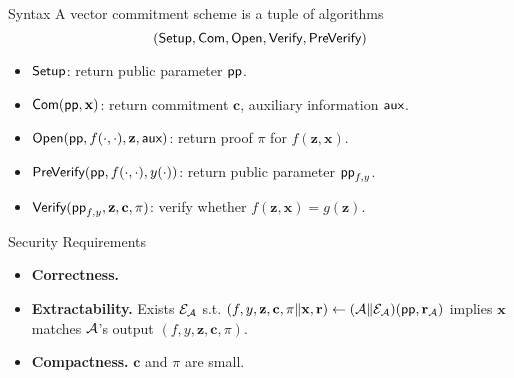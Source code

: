 \begin{frame}{Syntax}
	A vector commitment scheme is a tuple of algorithms
	\begin{equation*}
		(\textsf{Setup}, \textsf{Com}, \textsf{Open}, \textsf{Verify}, \textsf{PreVerify})
	\end{equation*}
	
	\begin{itemize}
		\item$\textsf{Setup}$: return public parameter $\textsf{pp}$.
		\item$\textsf{Com}(\textsf{pp}, \mathbf{x})$: return commitment $\mathbf{c}$, auxiliary information $\textsf{aux}$.
		\item$\textsf{Open}(\textsf{pp}, f(\cdot, \cdot), \mathbf{z}, \textsf{aux})$: return proof $\pi$ for $f(\mathbf{z}, \mathbf{x})$. 
		\item$\textsf{PreVerify}(\textsf{pp}, f(\cdot, \cdot), y(\cdot))$: return public parameter $\textsf{pp}_{f, y}$.
		\item$\textsf{Verify}(\textsf{pp}_{f, y}, \mathbf{z}, \mathbf{c}, \pi)$: verify whether $f(\mathbf{z}, \mathbf{x}) = g(\mathbf{z})$.
	\end{itemize}
\end{frame}

\begin{frame}{Security Requirements}
	\begin{itemize}
		\item \textbf{Correctness.}
		\item \textbf{Extractability.} Exists $\mathcal{E}_\mathcal{A}$ s.t.  $\left(f, y, \mathbf{z}, \mathbf{c}, \pi \Vert \mathbf{x}, \mathbf{r}\right) \leftarrow (\mathcal{A}\Vert \mathcal{E}_\mathcal{A})(\textsf{pp}, \mathbf{r}_\mathcal{A})$ implies $\mathbf{x}$ matches $\mathcal{A}$'s output $(f, y, \mathbf{z}, \mathbf{c}, \pi)$.
		\item \textbf{Compactness.} $\mathbf{c}$ and $\pi$ are small.
	\end{itemize}
\end{frame}